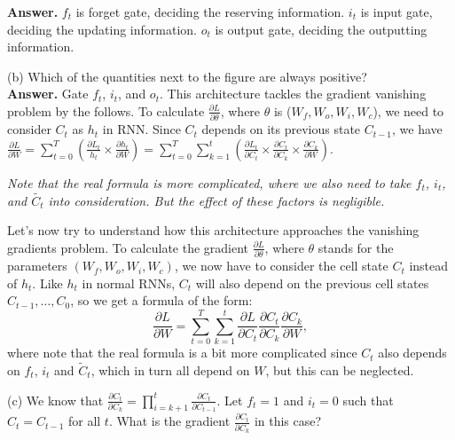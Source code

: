 \documentclass[12pt]{article}
\begin{document}
\textcolor{ans}{\textbf{Answer.} $f_t$ is forget gate, deciding the reserving information. $i_t$ is input gate, deciding the updating information. $o_t$ is output gate, deciding the outputting information. \\}
 
 (b) Which of the quantities next to the figure are always positive? \\

\textcolor{ans}{\textbf{Answer.} Gate $f_t$, $i_t$, and $o_t$. This architecture tackles the gradient vanishing problem by the follows. To calculate $\frac{\partial L}{\partial \theta}$, where $\theta$ is ($W_f, W_o, W_i, W_c$), we need to consider $C_t$ as $h_t$ in RNN. Since $C_t$ depends on its previous state $C_{t-1}$, we have $\frac{\partial L}{\partial W}=\sum_{t=0}^T (\frac{\partial L_t}{h_t}\times  \frac{\partial h_t}{\partial W})=\sum_{t=0}^T\sum_{k=1}^{t}(\frac{\partial L_t}{\partial C_t}\times \frac{\partial C_t}{\partial C_{k}}\times \frac{\partial C_k}{\partial W})$.}

\textcolor{ans}{ \textit{Note that the real formula is more complicated, where we also need to take $f_t$, $i_t$, and $\tilde{C_t}$ into consideration. But the effect of these factors is negligible.} \\}
 
 \noindent Let’s now try to understand how this architecture approaches the vanishing gradients problem. To calculate the gradient $\frac{\partial L}{\partial \theta}$, where $\theta$ stands for the parameters $(W_f, W_o, W_i, W_c)$, we now have to consider the cell state $C_t$ instead of $h_t$. Like $h_t$ in normal RNNs, $C_t$ will also depend on the previous cell states $C_{t-1}, \ldots, C_0$, so we get a formula of the form:
 \begin{equation*}
 \frac{\partial L}{\partial W} = \sum_{t=0}^T \sum_{k=1}^t \frac{\partial L}{\partial C_t} \frac{\partial C_t}{\partial C_k} \frac{\partial C_k}{\partial W},
 \end{equation*}
 where note that the real formula is a bit more complicated since $C_t$ also depends on $f_t$, $i_t$ and $\widetilde{C}_t$, which in turn all depend on $W$, but this can be neglected.
 
 (c) We know that $\frac{\partial C_t}{\partial C_k} = \prod_{i=k+1}^t \frac{\partial C_t}{\partial C_{t-1}}$. Let $f_t=1$ and $i_t=0$ such that $C_t = C_{t-1}$ for all $t$. What is the gradient $\frac{\partial C_t}{\partial C_k}$ in this case?\\
\end{document}
